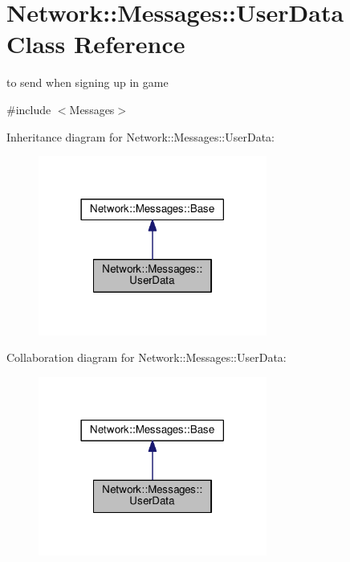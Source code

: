 \hypertarget{class_network_1_1_messages_1_1_user_data}{}\section{Network\+:\+:Messages\+:\+:User\+Data Class Reference}
\label{class_network_1_1_messages_1_1_user_data}


to send when signing up in game  




{\ttfamily \#include $<$Messages$>$}



Inheritance diagram for Network\+:\+:Messages\+:\+:User\+Data\+:
\nopagebreak
\begin{figure}[H]
\begin{center}
\leavevmode
\includegraphics[width=213pt]{class_network_1_1_messages_1_1_user_data__inherit__graph}
\end{center}
\end{figure}


Collaboration diagram for Network\+:\+:Messages\+:\+:User\+Data\+:
\nopagebreak
\begin{figure}[H]
\begin{center}
\leavevmode
\includegraphics[width=213pt]{class_network_1_1_messages_1_1_user_data__coll__graph}
\end{center}
\end{figure}
